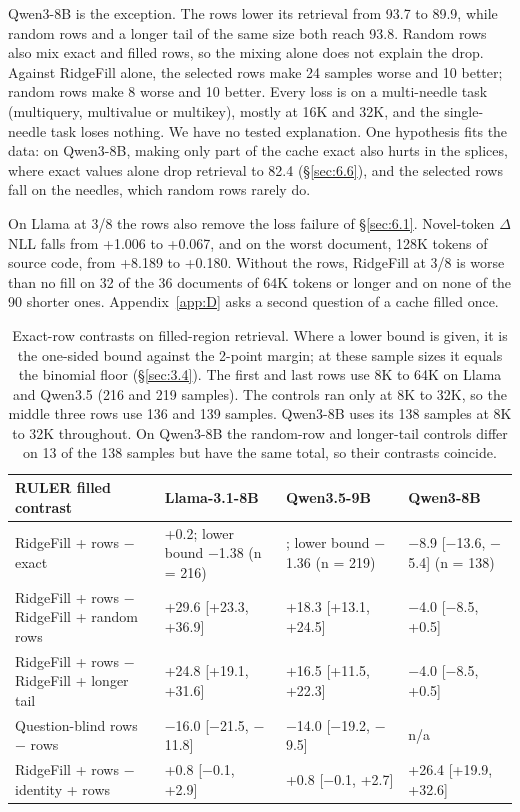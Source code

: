 \documentclass[11pt]{article}
\begin{document}
Qwen3-8B is the exception. The rows lower its retrieval from 93.7 to 89.9, while random rows and a longer tail of the same size both reach 93.8. Random rows also mix exact and filled rows, so the mixing alone does not explain the drop. Against RidgeFill alone, the selected rows make 24 samples worse and 10 better; random rows make 8 worse and 10 better. Every loss is on a multi-needle task (multiquery, multivalue or multikey), mostly at 16K and 32K, and the single-needle task loses nothing. We have no tested explanation. One hypothesis fits the data: on Qwen3-8B, making only part of the cache exact also hurts in the splices, where exact values alone drop retrieval to 82.4 (\S\ref{sec:6.6}), and the selected rows fall on the needles, which random rows rarely do.

On Llama at 3/8 the rows also remove the loss failure of \S\ref{sec:6.1}. Novel-token $\Delta$NLL falls from +1.006 to +0.067, and on the worst document, 128K tokens of source code, from +8.189 to +0.180. Without the rows, RidgeFill at 3/8 is worse than no fill on 32 of the 36 documents of 64K tokens or longer and on none of the 90 shorter ones. Appendix~\ref{app:D} asks a second question of a cache filled once.

\begin{table}[!htbp]
\centering
\caption{Exact-row contrasts on filled-region retrieval. Where a lower bound is given, it is the one-sided bound against the 2-point margin; at these sample sizes it equals the binomial floor (\S\ref{sec:3.4}). The first and last rows use 8K to 64K on Llama and Qwen3.5 (216 and 219 samples). The controls ran only at 8K to 32K, so the middle three rows use 136 and 139 samples. Qwen3-8B uses its 138 samples at 8K to 32K throughout. On Qwen3-8B the random-row and longer-tail controls differ on 13 of the 138 samples but have the same total, so their contrasts coincide.}\label{tab:22}
\footnotesize
\setlength{\tabcolsep}{4pt}
\begin{tabularx}{\linewidth}{>{\raggedright\arraybackslash\hsize=1.197\hsize}X>{\raggedright\arraybackslash\hsize=0.952\hsize}X>{\raggedright\arraybackslash\hsize=0.925\hsize}X>{\raggedright\arraybackslash\hsize=0.925\hsize}X}
\toprule
RULER filled contrast & Llama-3.1-8B & Qwen3.5-9B & Qwen3-8B \\
\midrule
RidgeFill + rows $-$ exact & +0.2; lower bound $-$1.38 (n = 216) & 0.0; lower bound $-$1.36 (n = 219) & $-$8.9 [$-$13.6, $-$5.4] (n = 138) \\
RidgeFill + rows $-$ RidgeFill + random rows & +29.6 [+23.3, +36.9] & +18.3 [+13.1, +24.5] & $-$4.0 [$-$8.5, +0.5] \\
RidgeFill + rows $-$ RidgeFill + longer tail & +24.8 [+19.1, +31.6] & +16.5 [+11.5, +22.3] & $-$4.0 [$-$8.5, +0.5] \\
Question-blind rows $-$ rows & $-$16.0 [$-$21.5, $-$11.8] & $-$14.0 [$-$19.2, $-$9.5] & n/\allowbreak{}a \\
RidgeFill + rows $-$ identity + rows & +0.8 [$-$0.1, +2.9] & +0.8 [$-$0.1, +2.7] & +26.4 [+19.9, +32.6] \\
\bottomrule
\end{tabularx}
\end{table}
\end{document}
